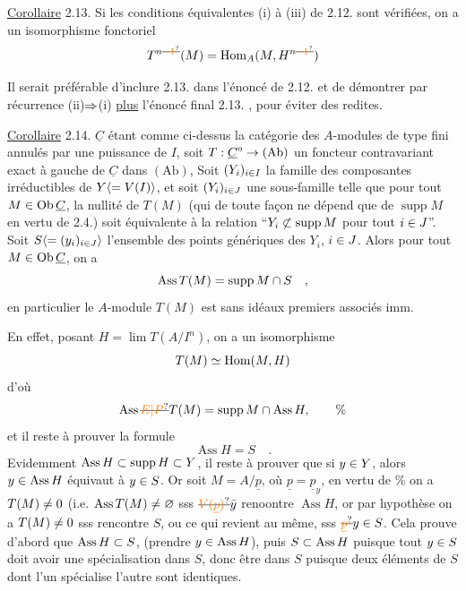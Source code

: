 \uline{Corollaire} 2.13. Si les conditions équivalentes (i) à (iii) de 2.12. sont
vérifiées, on a un isomorphisme fonctoriel
\[
T^{n\deleted{\unsure{-1}}}(M)=\operatorname{Hom}_A(M,H^{n\deleted{\unsure{-1}}})
\]

Il serait préférable d'inclure 2.13. dans l'énoncé de 2.12. et de
démontrer par récurrence (ii)$\Rightarrow$(i) \uline{plus} l'énoncé final 2.13. , pour éviter des redites.

\uline{Corollaire} 2.14. $\underline C$ étant comme ci-dessus la catégorie des $A$-modules de type fini annulés par une puissance de $I$, soit $T:\underline C^o\to(\mathrm{Ab})$ un foncteur
contravariant exact à gauche de $\underline C$ dans $(\mathrm{Ab})$, Soit $(Y_i)_{i\in I}$ la famille des
composantes irréductibles de $Y\inserted{=V(I)}$, et soit $(Y_i)_{i\in J}$ une sous-famille telle
que pour tout $M\in\mathrm{Ob}\,\underline C$, la nullité de $T(M)$ (qui de toute façon ne dépend
que de $\operatorname{supp}M$ en vertu de 2.4.) soit équivalente à la relation ``$Y_i\not\subset
\operatorname{supp}M$ pour tout $i\in J$''. Soit $S\inserted{\handwritten{=(y_i)_{i\in J}}}$ l'ensemble des points génériques des
$Y_i$, $i\in J$. Alors pour tout $M\in\mathrm{Ob}\,\underline C$, on a
\[
\operatorname{Ass}T(M)=\operatorname{supp}M\cap S\quad,
\]
en particulier le $A$-module $T(M)$ est sans idéaux premiers associés imm.

En effet, posant $H=\lim T(A/I^n)$, on a un isomorphisme
\[
T(M)\simeq\operatorname{Hom}(M,H)
\]
d'où
\[
\operatorname{Ass}\deleted{\unsure{E|P}}T(M)=\operatorname{supp}M\handwritten{\cap}\operatorname{Ass}H\handwritten{,}\tag*{\%}
\]
et il reste à prouver la formule
\[
\operatorname{Ass}H=S\quad.
\]
 Evidemment $\operatorname{Ass}H\subset\operatorname{supp}H\subset Y$, il reste à prouver que si $y\in Y$,
alors $y\in\operatorname{Ass}H$ équivaut à $y\in S$. Or soit $M=A/\underline p$, où $\underline p=\underline p_y$,  en
vertu de \% on a $T(M)\ne0$ (i.e. $\operatorname{Ass}T(M)\ne\varnothing$\handwritten{)} sss $\deleted{\unsure{V(\underline p)}}\handwritten{\bar y}$  renoontre  $\operatorname{Ass}H$,
or par hypothèse on a $T(M)\ne0$ sss   rencontre  $S$,
ou ce qui revient au même, sss $\deleted{\unsure{\underline p}}\handwritten{y\in}S$. Cela prouve d'abord que $\operatorname{Ass}H\subset S$,
(prendre $y\in\operatorname{Ass}H$), puis $S\subset\operatorname{Ass}H$ puisque tout $y\in S$ doit avoir une
spécialisation dans $S$, donc être dans $S$ puisque deux éléments de $S$ dont
 l'un spécialise l'autre sont identiques.

